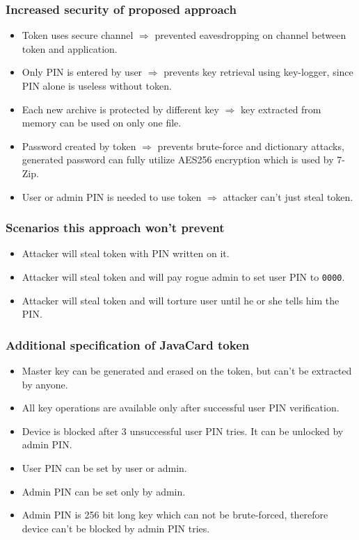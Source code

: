 \documentclass[letterpaper]{article}
\begin{document}
\subsubsection*{Increased security of proposed approach}
\begin{itemize}
\item Token uses secure channel $\Rightarrow$ prevented eavesdropping on 
channel between token and application.
\item Only PIN is entered by user $\Rightarrow$ prevents key retrieval using key-logger,
since PIN alone is useless without token.
\item Each new archive is protected by different key $\Rightarrow$ key extracted from
memory can be used on only one file.
\item Password created by token $\Rightarrow$ prevents brute-force and dictionary attacks,
generated password can fully utilize AES256 encryption which is used by 7-Zip.
\item User or admin PIN is needed to use token $\Rightarrow$ attacker can't just steal token.
\end{itemize}

\subsubsection*{Scenarios this approach won't prevent}
\begin{itemize}
\item Attacker will steal token with PIN written on it.
\item Attacker will steal token and will pay rogue admin to set user PIN to \texttt{0000}.
\item Attacker will steal token and will torture user until he or she tells him the PIN.
\end{itemize}

\subsubsection*{Additional specification of JavaCard token}
\begin{itemize}
\item Master key can be generated and erased on the token, but can't be extracted by anyone.
\item All key operations are available only after successful user PIN verification.
\item Device is blocked after 3 unsuccessful user PIN tries. It can be unlocked by admin PIN.
\item User PIN can be set by user or admin.
\item Admin PIN can be set only by admin.
\item Admin PIN is 256 bit long key which can not be brute-forced, therefore device can't
be blocked by admin PIN tries.
\end{itemize}
\end{document}
